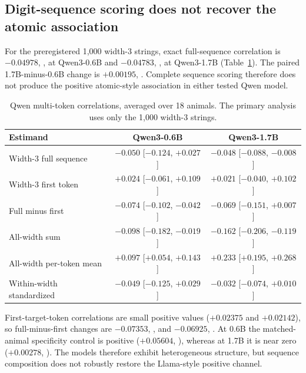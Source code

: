 \subsection{Digit-sequence scoring does not recover the atomic association}

For the preregistered 1,000 width-3 strings, exact full-sequence correlation is
$-0.04978$, , at Qwen3-0.6B and $-0.04783$,
, at Qwen3-1.7B (Table~\ref{tab:qwen}). The paired
1.7B-minus-0.6B change is $+0.00195$, . Complete
sequence scoring therefore does not produce the positive atomic-style
association in either tested Qwen model.

\begin{table}[t]
  \centering
  \caption{Qwen multi-token correlations, averaged over 18 animals. The primary
  analysis uses only the 1,000 width-3 strings.}
  \label{tab:qwen}
  \begin{tabular}{lcc}
    \toprule
    Estimand & Qwen3-0.6B & Qwen3-1.7B \\
    \midrule
    Width-3 full sequence & $-0.050$ [$-0.124$, $+0.027$] & $-0.048$ [$-0.088$, $-0.008$] \\
    Width-3 first token & $+0.024$ [$-0.061$, $+0.109$] & $+0.021$ [$-0.040$, $+0.102$] \\
    Full minus first & $-0.074$ [$-0.102$, $-0.042$] & $-0.069$ [$-0.151$, $+0.007$] \\
    All-width sum & $-0.098$ [$-0.182$, $-0.019$] & $-0.162$ [$-0.206$, $-0.119$] \\
    All-width per-token mean & $+0.097$ [$+0.054$, $+0.143$] & $+0.233$ [$+0.195$, $+0.268$] \\
    Within-width standardized & $-0.049$ [$-0.125$, $+0.029$] & $-0.032$ [$-0.074$, $+0.010$] \\
    \bottomrule
  \end{tabular}
\end{table}

First-target-token correlations are small positive values ($+0.02375$ and
$+0.02142$), so full-minus-first changes are $-0.07353$,
, and $-0.06925$,
. At 0.6B the matched-animal specificity control is
positive ($+0.05604$, ), whereas at 1.7B it is near
zero ($+0.00278$, ). The models therefore exhibit
heterogeneous structure, but sequence composition does not robustly restore the
Llama-style positive channel.

